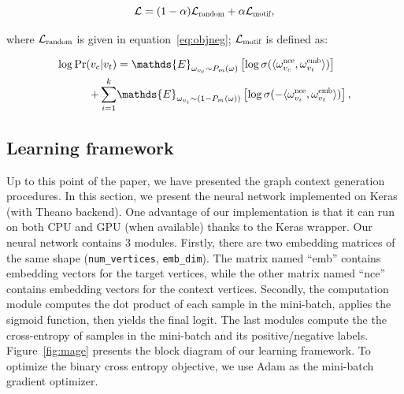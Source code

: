 \documentclass[letterpaper]{article}
\begin{document}
            \begin{equation}
                \label{eq:mageobj}
                \mathcal{L} = (1-\alpha) \mathcal{L}_{\scalebox{0.7}{random}} + 
                                \alpha \mathcal{L}_{\scalebox{0.7}{motif}} ,
            \end{equation}

            \noindent
            where $\mathcal{L}_{\scalebox{0.7}{random}}$ is given in equation~\ref{eq:objneg};
            $\mathcal{L}_{\scalebox{0.7}{motif}}$ is defined as:

            \begin{equation}
                \label{eq:objmotif}
                \begin{aligned}
                    \log \mbox{Pr} (v_c | v_t) & = \mathds{E}_{\omega_{v_c} \sim P_m(\omega)} \left[ \log \sigma( \langle \omega^{\scalebox{0.7}{nce}}_{v_c} , \omega^{\scalebox{0.7}{emb}}_{v_t} \rangle ) \right] \\
                + \sum_{i=1}^{k} & \mathds{E}_{\omega_{v_i} \sim (1-P_m(\omega))} \left[ \log \sigma( -\langle \omega^{\scalebox{0.7}{nce}}_{v_i} , \omega^{\scalebox{0.7}{emb}}_{v_t} \rangle) \right],
                \end{aligned}
            \end{equation}

        \subsection{Learning framework}
            
            Up to this point of the paper, we have presented the graph context generation procedures.
            In this section, we present the neural network implemented on Keras \cite{keras} 
            (with Theano \cite{theano} backend). One advantage of our implementation is that
            it can run on both CPU and GPU (when available) thanks to the Keras wrapper. Our
            neural network contains 3 modules. Firstly, there are two embedding matrices of 
            the same shape (\texttt{num\_vertices}, \texttt{emb\_dim}). The matrix named ``emb''
            contains embedding vectors for the target vertices, while the other matrix named
            ``nce'' contains embedding vectors for the context vertices. Secondly, the computation
            module computes the dot product of each sample in the mini-batch, applies the
            sigmoid function, then yields the final logit. The last modules compute the
            the cross-entropy \cite{xentropy} of samples in the mini-batch and its positive/negative
            labels. Figure~\ref{fig:mage} presents the block diagram of our learning framework.
            To optimize the binary cross entropy objective, we use Adam \cite{adam} as the 
            mini-batch gradient optimizer.
            
\end{document}
